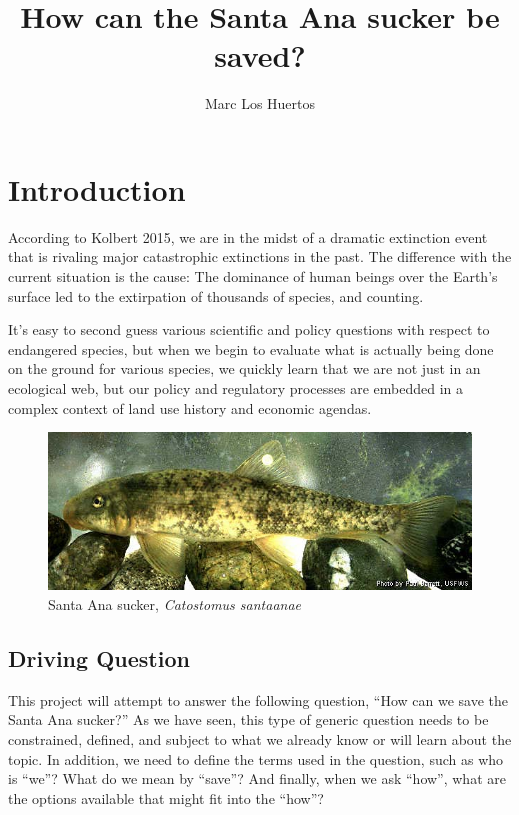 \documentclass{tufte-handout}\usepackage[]{graphicx}\usepackage[]{color}
\title{How can the Santa Ana sucker be saved?}
\author{Marc Los Huertos}
\begin{document}
\maketitle

\section{Introduction}

According to Kolbert 2015, we are in the midst of a dramatic extinction event that is rivaling major catastrophic extinctions in the past. The difference with the current situation is the cause: The dominance of human beings over the Earth's surface led to the extirpation of thousands of species, and counting. 

It's easy to second guess various scientific and policy questions with respect to endangered species, but when we begin to evaluate what is actually being done on the ground for various species, we quickly learn that we are not just in an ecological web, but our policy and regulatory processes are embedded in a complex context of land use history and economic agendas.  

\begin{figure}
    \includegraphics[width=1.0\textwidth]{Catostomus_santaanae.jpg}
  \caption{Santa Ana sucker, \emph{Catostomus santaanae}}
\end{figure}

\subsection{Driving Question}

This project will attempt to answer the following question, ``How can we save the Santa Ana sucker?'' As we have seen, this type of generic question needs to be constrained, defined, and subject to what we already know or will learn about the topic. In addition, we need to define the terms used in the question, such as who is ``we''? What do we mean by ``save''?  And finally, when we ask ``how'', what are the options available that might fit into the ``how''? 
\end{document}
